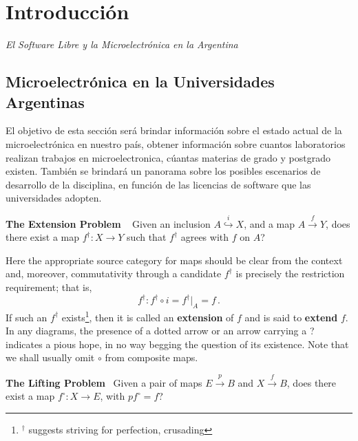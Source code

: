 

\chapter{Introducci\'on}
\begin{center}
{\small\em El Software Libre y la Microelectr\'onica en la Argentina}
\end{center}

\section{Microelectrónica en la Universidades Argentinas}
El objetivo de esta sección será brindar información sobre el estado actual de la microelectrónica en nuestro país, obtener información sobre cuantos laboratorios realizan trabajos en microelectronica, cúantas materias de grado y postgrado existen. 
También se brindará un panorama sobre los posibles escenarios de desarrollo de la disciplina, en función de las licencias de software que las universidades adopten. 

\noindent
{\bf The Extension Problem} \    %
Given an inclusion $ A \stackrel{i}{\hookrightarrow} X $, and a map
$ A \stackrel{f}{\rightarrow} Y $,
does there exist a map $f^{\dagger}:X\to Y$ such that
$f^{\dagger}$ agrees with $f$ on $A$?

Here the appropriate source category for maps should be clear from the
context and, moreover, commutativity through a
candidate $f^{\dagger}$ is precisely
the restriction requirement; that is,
$$f^{\dagger}   :  f^{\dagger}\circ i = f^{\dagger}|_A = f\,. $$
If such an $f^{\dagger}$ exists\footnote{${}^{\dagger}$ suggests striving
for perfection, crusading}, then it is called an {\bf
extension} of $f$ and is said to {\bf
extend} $f$. In any diagrams, the presence of
a dotted arrow or an arrow carrying a ? indicates a pious hope, in no way
begging the question of its existence. Note that we shall usually
omit $\circ$ from composite maps.

\noindent
{\bf The Lifting Problem} \
Given a pair of maps $E \stackrel{p}{\rightarrow}B$ and $X \stackrel{f}
{\rightarrow} B $,
does there exist a map $f^{\circ} : X \to E$, with
$pf^{\circ} = f  $?


